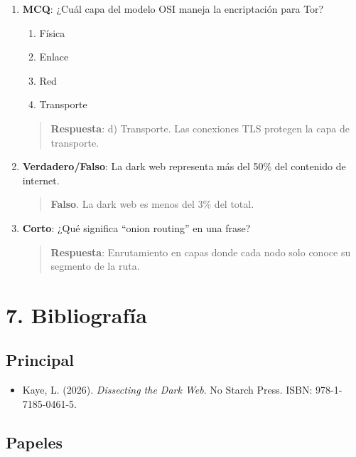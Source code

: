 \documentclass[
  letterpaper,
]{report}
\providecommand{\tightlist}{%
  \setlength{\itemsep}{0pt}\setlength{\parskip}{0pt}}
\begin{document}
\begin{enumerate}
\def\labelenumi{\arabic{enumi}.}
\item
  \textbf{MCQ}: ¿Cuál capa del modelo OSI maneja la encriptación para
  Tor?

  \begin{enumerate}
  \def\labelenumii{\alph{enumii})}
  \tightlist
  \item
    Física
  \item
    Enlace
  \item
    Red
  \item
    Transporte
  \end{enumerate}

  \begin{quote}
  \textbf{Respuesta}: d) Transporte. Las conexiones TLS protegen la capa
  de transporte.
  \end{quote}
\item
  \textbf{Verdadero/Falso}: La dark web representa más del 50\% del
  contenido de internet.

  \begin{quote}
  \textbf{Falso}. La dark web es menos del 3\% del total.
  \end{quote}
\item
  \textbf{Corto}: ¿Qué significa ``onion routing'' en una frase?

  \begin{quote}
  \textbf{Respuesta}: Enrutamiento en capas donde cada nodo solo conoce
  su segmento de la ruta.
  \end{quote}
\end{enumerate}

\section{7. Bibliografía}\label{bibliografuxeda-1}

\subsection{Principal}\label{principal}

\begin{itemize}
\tightlist
\item
  Kaye, L. (2026). \emph{Dissecting the Dark Web}. No Starch Press.
  ISBN: 978-1-7185-0461-5.
\end{itemize}

\subsection{Papeles}\label{papeles}
\end{document}

